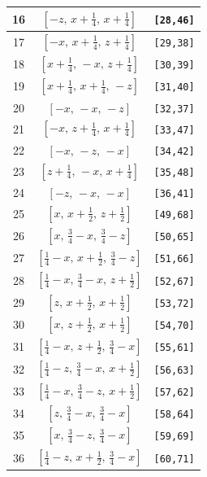 \documentclass[fleqn,8pt]{jsarticle}
\begin{document}
\begin{longtable}{ccc}
16 & $\left[ - z,\, x + \frac{1}{4},\, x + \frac{1}{4} \right]$ & {\tt [28,46]} \\ \hline
17 & $\left[ - x,\, x + \frac{1}{4},\, z + \frac{1}{4} \right]$ & {\tt [29,38]} \\ \hline
18 & $\left[ x + \frac{1}{4},\, - x,\, z + \frac{1}{4} \right]$ & {\tt [30,39]} \\ \hline
19 & $\left[ x + \frac{1}{4},\, x + \frac{1}{4},\, - z \right]$ & {\tt [31,40]} \\ \hline
20 & $\left[ - x,\, - x,\, - z \right]$ & {\tt [32,37]} \\ \hline
21 & $\left[ - x,\, z + \frac{1}{4},\, x + \frac{1}{4} \right]$ & {\tt [33,47]} \\ \hline
22 & $\left[ - x,\, - z,\, - x \right]$ & {\tt [34,42]} \\ \hline
23 & $\left[ z + \frac{1}{4},\, - x,\, x + \frac{1}{4} \right]$ & {\tt [35,48]} \\ \hline
24 & $\left[ - z,\, - x,\, - x \right]$ & {\tt [36,41]} \\ \hline
25 & $\left[ x,\, x + \frac{1}{2},\, z + \frac{1}{2} \right]$ & {\tt [49,68]} \\ \hline
26 & $\left[ x,\, \frac{3}{4} - x,\, \frac{3}{4} - z \right]$ & {\tt [50,65]} \\ \hline
27 & $\left[ \frac{1}{4} - x,\, x + \frac{1}{2},\, \frac{3}{4} - z \right]$ & {\tt [51,66]} \\ \hline
28 & $\left[ \frac{1}{4} - x,\, \frac{3}{4} - x,\, z + \frac{1}{2} \right]$ & {\tt [52,67]} \\ \hline
29 & $\left[ z,\, x + \frac{1}{2},\, x + \frac{1}{2} \right]$ & {\tt [53,72]} \\ \hline
30 & $\left[ x,\, z + \frac{1}{2},\, x + \frac{1}{2} \right]$ & {\tt [54,70]} \\ \hline
31 & $\left[ \frac{1}{4} - x,\, z + \frac{1}{2},\, \frac{3}{4} - x \right]$ & {\tt [55,61]} \\ \hline
32 & $\left[ \frac{1}{4} - z,\, \frac{3}{4} - x,\, x + \frac{1}{2} \right]$ & {\tt [56,63]} \\ \hline
33 & $\left[ \frac{1}{4} - x,\, \frac{3}{4} - z,\, x + \frac{1}{2} \right]$ & {\tt [57,62]} \\ \hline
34 & $\left[ z,\, \frac{3}{4} - x,\, \frac{3}{4} - x \right]$ & {\tt [58,64]} \\ \hline
35 & $\left[ x,\, \frac{3}{4} - z,\, \frac{3}{4} - x \right]$ & {\tt [59,69]} \\ \hline
36 & $\left[ \frac{1}{4} - z,\, x + \frac{1}{2},\, \frac{3}{4} - x \right]$ & {\tt [60,71]} \\ \hline

\end{longtable}
\end{document}
